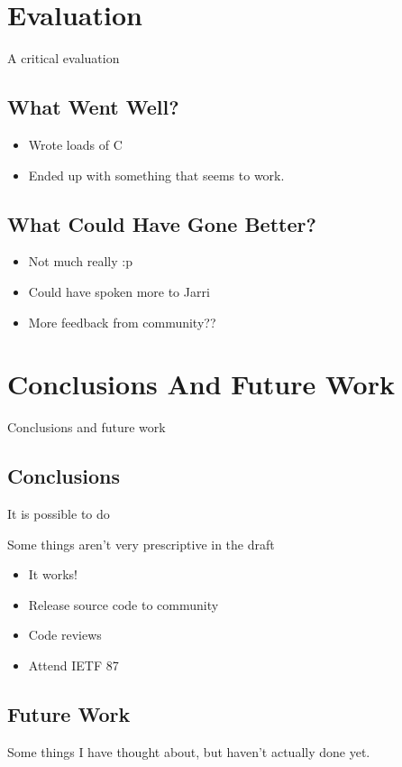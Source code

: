 \documentclass[12pt]{report}
\begin{document}
\chapter{Evaluation}
A critical evaluation

\section{What Went Well?}

\begin{itemize}
\item Wrote loads of C
\item Ended up with something that seems to work.
\end{itemize}

\section{What Could Have Gone Better?}

\begin{itemize}
\item Not much really :p
\item Could have spoken more to Jarri
\item More feedback from community??
\end{itemize}

\chapter{Conclusions And Future Work}
Conclusions and future work

\section{Conclusions}

It is possible to do

Some things aren't very prescriptive in the draft

\begin{itemize}
\item It works! 
\item Release source code to community
\item Code reviews
\item Attend IETF 87
\end{itemize}

\section{Future Work}
Some things I have thought about, but haven't actually done yet.
\end{document}
